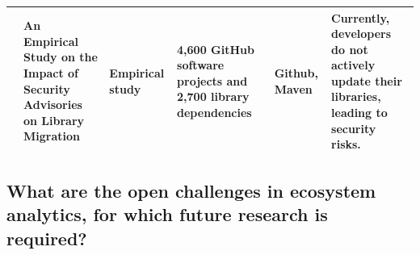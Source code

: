\documentclass[]{book}
\begin{document}
\begin{longtable}[]{@{}llllll@{}}
\begin{minipage}[t]{0.10\columnwidth}
\end{minipage} & \begin{minipage}[t]{0.18\columnwidth}\raggedright\strut
An Empirical Study on the Impact of Security Advisories on Library
Migration\strut
\end{minipage} & \begin{minipage}[t]{0.19\columnwidth}\raggedright\strut
Empirical study\strut
\end{minipage} & \begin{minipage}[t]{0.11\columnwidth}\raggedright\strut
4,600 GitHub software projects and 2,700 library dependencies\strut
\end{minipage} & \begin{minipage}[t]{0.13\columnwidth}\raggedright\strut
Github, Maven\strut
\end{minipage} & \begin{minipage}[t]{0.11\columnwidth}\raggedright\strut
Currently, developers do not actively update their libraries, leading to
security risks.\strut
\end{minipage}\tabularnewline
\bottomrule
\end{longtable}

\subsection{What are the open challenges in ecosystem analytics, for
which future research is
required?}\label{what-are-the-open-challenges-in-ecosystem-analytics-for-which-future-research-is-required}
\end{document}
